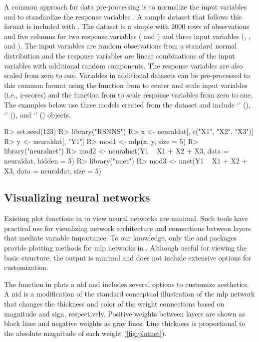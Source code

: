 \documentclass[article]{jss}
\begin{document}
A common approach for data pre-processing is to normalize the input
variables and to standardize the response variables
\citep{Lek00,Olden02}.  A sample dataset that follows this format is
included with .  The  dataset is a
simple  with 2000 rows of observations and five
columns for two response variables ( and ) and three
input variables (, , and ).  The input
variables are random observations from a standard normal distribution
and the response variables are linear combinations of the input
variables with additional random components.  The response variables
are also scaled from zero to one.  Variables in additional datasets can be
pre-processed to this common format using the  function
from  to center and scale input variables (i.e., z-scores) 
and the  function from  to scale response variables 
from zero to one.  The examples below use three models created from the 
 dataset and include `' (), `' 
(), and `' () objects.
%
\begin{Schunk}
\begin{Sinput}
R> set.seed(123)
R> library("RSNNS")
R> x <- neuraldat[, c("X1", "X2", "X3")]
R> y <- neuraldat[, "Y1"]
R> mod1 <- mlp(x, y, size = 5)
R> library("neuralnet")
R> mod2 <- neuralnet(Y1 ~ X1 + X2 + X3, data = neuraldat, hidden = 5)
R> library("nnet")
R> mod3 <- nnet(Y1 ~ X1 + X2 + X3, data = neuraldat, size = 5)
\end{Sinput}
\end{Schunk}

\subsection{Visualizing neural networks}

Existing plot functions in  to view neural networks are
minimal.  Such tools have practical use for visualizing network
architecture and connections between layers that mediate variable
importance. To our knowledge, only the  and
 packages provide plotting methods for \ac{mlp} networks
in .  Although useful for viewing the basic structure, the
output is minimal and does not include extensive options for
customization.

The  function in  plots a \acl{nid}
\citep[\acs{nid};][]{Ozesmi99} and includes several options to
customize aesthetics. A \ac{nid} is a modification of the standard
conceptual illustration of the \ac{mlp} network that changes the
thickness and color of the weight connections based on magnitude and
sign, respectively.  Positive weights between layers are shown as
black lines and negative weights as gray lines. Line thickness is
proportional to the absolute magnitude of each weight
(\cref{fig:plotnet}).
\end{document}
